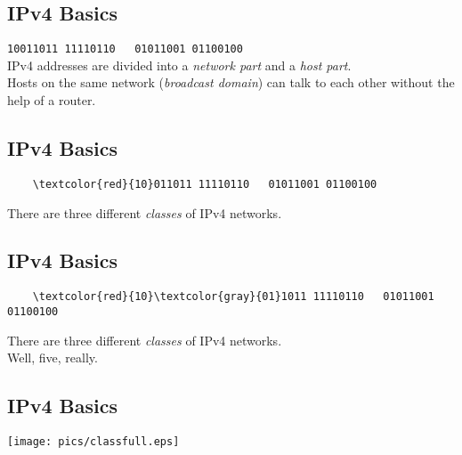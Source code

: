 \documentclass[xga]{xdvislides}
\begin{document}
\subsection{IPv4 Basics}
\vspace{.5in}
\Hugesize
\begin{center}
\verb|10011011 11110110   01011001 01100100| \\
\vspace{.5in}
IPv4 addresses are divided into a {\em network part} and a {\em host part}. \\
\vspace{.25in}
Hosts on the same network ({\em broadcast domain}) can talk to each other
without the help of a router.
\end{center}
\Normalsize

\subsection{IPv4 Basics}
\vspace{.5in}
\Hugesize
\begin{center}
\begin{Verbatim}
    \textcolor{red}{10}011011 11110110   01011001 01100100
\end{Verbatim}
\vspace{.5in}
There are three different {\em classes} of IPv4 networks.
\end{center}
\Normalsize

\subsection{IPv4 Basics}
\vspace{.5in}
\Hugesize
\begin{center}
\begin{Verbatim}
    \textcolor{red}{10}\textcolor{gray}{01}1011 11110110   01011001 01100100
\end{Verbatim}
\vspace{.5in}
There are three different {\em classes} of IPv4 networks. \\
Well, five, really.
\end{center}
\Normalsize

\subsection{IPv4 Basics}
\vspace*{\fill}
\begin{center}
	\texttt{[image: pics/classfull.eps]}
\end{center}
\vspace*{\fill}
\end{document}
